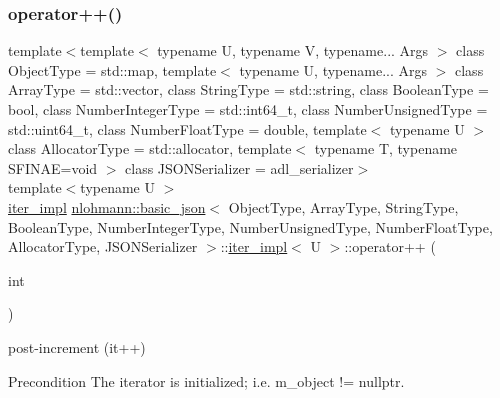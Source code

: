 \subsubsection{\texorpdfstring{operator++()}{operator++()}\hspace{0.1cm}{\footnotesize\ttfamily [1/2]}}
{\footnotesize\ttfamily template$<$template$<$ typename U, typename V, typename... Args $>$ class Object\+Type = std\+::map, template$<$ typename U, typename... Args $>$ class Array\+Type = std\+::vector, class String\+Type  = std\+::string, class Boolean\+Type  = bool, class Number\+Integer\+Type  = std\+::int64\+\_\+t, class Number\+Unsigned\+Type  = std\+::uint64\+\_\+t, class Number\+Float\+Type  = double, template$<$ typename U $>$ class Allocator\+Type = std\+::allocator, template$<$ typename T, typename S\+F\+I\+N\+A\+E=void $>$ class J\+S\+O\+N\+Serializer = adl\+\_\+serializer$>$ \\
template$<$typename U $>$ \\
\hyperlink{classnlohmann_1_1basic__json_1_1iter__impl}{iter\+\_\+impl} \hyperlink{classnlohmann_1_1basic__json}{nlohmann\+::basic\+\_\+json}$<$ Object\+Type, Array\+Type, String\+Type, Boolean\+Type, Number\+Integer\+Type, Number\+Unsigned\+Type, Number\+Float\+Type, Allocator\+Type, J\+S\+O\+N\+Serializer $>$\+::\hyperlink{classnlohmann_1_1basic__json_1_1iter__impl}{iter\+\_\+impl}$<$ U $>$\+::operator++ (\begin{DoxyParamCaption}\item[{int}]{ }\end{DoxyParamCaption})\hspace{0.3cm}{\ttfamily [inline]}}



post-\/increment (it++) 

\begin{DoxyPrecond}{Precondition}
The iterator is initialized; i.\+e. {\ttfamily m\+\_\+object != nullptr}. 
\end{DoxyPrecond}
\mbox{\label{classnlohmann_1_1basic__json_1_1iter__impl_a60e2723dae1c6d537fc914c664f1a81c}} 
